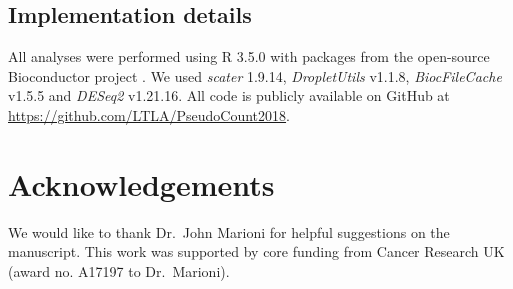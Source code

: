 \documentclass[10pt,letterpaper]{article}
\begin{document}
\subsection{Implementation details}
All analyses were performed using R 3.5.0 with packages from the open-source Bioconductor project \cite{huber2015orchestrating}.
We used \textit{scater} 1.9.14, \textit{DropletUtils} v1.1.8, \textit{BiocFileCache} v1.5.5 and \textit{DESeq2} v1.21.16. 
All code is publicly available on GitHub at \url{https://github.com/LTLA/PseudoCount2018}.

\section{Acknowledgements}
We would like to thank Dr.\ John Marioni for helpful suggestions on the manuscript.
This work was supported by core funding from Cancer Research UK (award no. A17197 to Dr.\ Marioni).



\end{document}
